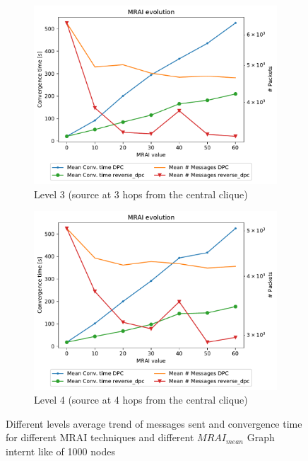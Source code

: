 \documentclass[10pt,conference,letterpaper]{IEEEtran}
\newcommand{\figwidth}{0.78}
\newcommand{\figvspace}{-1.5em}
\begin{document}
\begin{figure}[tb]
	\begin{subfigure}{.49\columnwidth}
		\centering
		\includegraphics[width=\figwidth\columnwidth]{images/different_levels/different_levels-1000_hier_3_mean.pdf}
		\caption{Level 3 (source at 3 hops from the central clique)}
		\label{fig:1000-mean-level3}
	\end{subfigure}
	\hfill
	\begin{subfigure}{.49\columnwidth}
		\centering
		\includegraphics[width=\figwidth\columnwidth]{images/different_levels/different_levels-1000_hier_4_mean.pdf}
		\caption{Level 4 (source at 4 hops from the central clique)}
		\label{fig:1000-mean-level4}
	\end{subfigure}

	\caption{Different levels average trend of messages sent and convergence time 
			 for different \ac{MRAI} techniques and different $MRAI_{mean}$
			 Graph internt like of \num{1000} nodes}
	\label{fig:1000-mean-allLevels}
	\vspace{\figvspace}
\end{figure}
\end{document}

